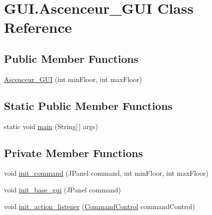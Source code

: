 \hypertarget{class_g_u_i_1_1_ascenceur___g_u_i}{}\section{G\+U\+I.\+Ascenceur\+\_\+\+G\+UI Class Reference}
\label{class_g_u_i_1_1_ascenceur___g_u_i}
\subsection*{Public Member Functions}
\begin{DoxyCompactItemize}
\item 
\mbox{\hyperlink{class_g_u_i_1_1_ascenceur___g_u_i_ab1c0ec7e7081e6661b4de2610eddaa0b}{Ascenceur\+\_\+\+G\+UI}} (int min\+Floor, int max\+Floor)
\end{DoxyCompactItemize}
\subsection*{Static Public Member Functions}
\begin{DoxyCompactItemize}
\item 
static void \mbox{\hyperlink{class_g_u_i_1_1_ascenceur___g_u_i_aed016f8cca79137b58b3452229b3f273}{main}} (String\mbox{[}$\,$\mbox{]} args)
\end{DoxyCompactItemize}
\subsection*{Private Member Functions}
\begin{DoxyCompactItemize}
\item 
void \mbox{\hyperlink{class_g_u_i_1_1_ascenceur___g_u_i_a5f574e8e2efb677ad7e6db424156cb6b}{init\+\_\+command}} (J\+Panel command, int min\+Floor, int max\+Floor)
\item 
void \mbox{\hyperlink{class_g_u_i_1_1_ascenceur___g_u_i_a6b457aeb9c45d8fcb9ccff234375aba2}{init\+\_\+base\+\_\+gui}} (J\+Panel command)
\item 
void \mbox{\hyperlink{class_g_u_i_1_1_ascenceur___g_u_i_ac1628fa2c2af89aba62d72cd3f19c1b3}{init\+\_\+action\+\_\+listener}} (\mbox{\hyperlink{interfacecontrol_1_1_command_control}{Command\+Control}} command\+Control)
\end{DoxyCompactItemize}

